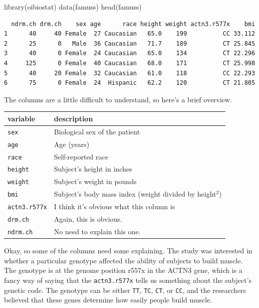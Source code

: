 \documentclass[
  letterpaper,
  DIV=11,
  numbers=noendperiod,
  oneside]{scrreprt}
\newenvironment{Shaded}{\begin{snugshade}}{\end{snugshade}}
\newcommand{\FunctionTok}[1]{\textcolor[rgb]{0.28,0.35,0.67}{#1}}
\newcommand{\NormalTok}[1]{\textcolor[rgb]{0.00,0.23,0.31}{#1}}
\begin{document}
\begin{Shaded}
\begin{Highlighting}[]
\FunctionTok{library}\NormalTok{(oibiostat)}
\FunctionTok{data}\NormalTok{(famuss)}
\FunctionTok{head}\NormalTok{(famuss)}
\end{Highlighting}
\end{Shaded}

\begin{verbatim}
  ndrm.ch drm.ch    sex age      race height weight actn3.r577x    bmi
1      40     40 Female  27 Caucasian   65.0    199          CC 33.112
2      25      0   Male  36 Caucasian   71.7    189          CT 25.845
3      40      0 Female  24 Caucasian   65.0    134          CT 22.296
4     125      0 Female  40 Caucasian   68.0    171          CT 25.998
5      40     20 Female  32 Caucasian   61.0    118          CC 22.293
6      75      0 Female  24  Hispanic   62.2    120          CT 21.805
\end{verbatim}

The columns are a little difficult to understand, so here's a brief
overview.

\begin{longtable}[]{@{}ll@{}}
\toprule\noalign{}
variable & description \\
\midrule\noalign{}
\endhead
\bottomrule\noalign{}
\endlastfoot
\texttt{sex} & Biological sex of the patient \\
\texttt{age} & Age (years) \\
\texttt{race} & Self-reported race \\
\texttt{height} & Subject's height in inches \\
\texttt{weight} & Subject's weight in pounds \\
\texttt{bmi} & Subject's body mass index (weight divided by
height\(^2\)) \\
\texttt{actn3.r577x} & I think it's obvious what this column is \\
\texttt{drm.ch} & Again, this is obvious. \\
\texttt{ndrm.ch} & No need to explain this one. \\
\end{longtable}

Okay, so some of the columns need some explaining. The study was
interested in whether a particular genotype affected the ability of
subjects to build muscle. The genotype is at the genome position r557x
in the ACTN3 gene, which is a fancy way of saying that the
\texttt{actn3.r577x} tells us something about the subject's genetic
code. The genotype can be either \texttt{TT}, \texttt{TC}, \texttt{CT},
or \texttt{CC}, and the researchers believed that these genes determine
how easily people build muscle.
\end{document}
